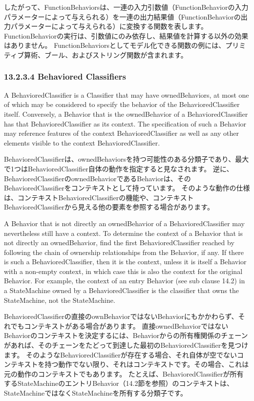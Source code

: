 \documentclass[a4paper,11pt]{ltjsarticle}
\begin{document}
したがって、FunctionBehaviorsは、一連の入力引数値（FunctionBehaviorの入力パラメーターによって与えられる）を一連の出力結果値（FunctionBehaviorの出力パラメーターによって与えられる）に変換する関数を表します。
FunctionBehaviorの実行は、引数値にのみ依存し、結果値を計算する以外の効果はありません。
FunctionBehaviorsとしてモデル化できる関数の例には、プリミティブ算術、ブール、およびストリング関数が含まれます。

\subsubsection*{13.2.3.4 Behaviored Classifiers}

A BehavioredClassifier is a Classifier that may have ownedBehaviors, at most one of which may be considered to specify the behavior of the BehavioredClassifier itself. 
Conversely, a Behavior that is the ownedBehavior of a BehavioredClassifier has that BehavioredClassifier as its context. 
The specification of such a Behavior may reference features of the context BehavioredClassifier as well as any other elements visible to the context BehavioredClassifier.

BehavioredClassifierは、ownedBehaviorsを持つ可能性のある分類子であり、最大で1つはBehavioredClassifier自体の動作を指定すると見なされます。
逆に、BehavioredClassifierのownedBehaviorであるBehaviorは、そのBehavioredClassifierをコンテキストとして持っています。
そのような動作の仕様は、コンテキストBehavioredClassifierの機能や、コンテキストBehavioredClassifierから見える他の要素を参照する場合があります。

A Behavior that is not directly an ownedBehavior of a BehavioredClassifier may nevertheless still have a context. 
To determine the context of a Behavior that is not directly an ownedBehavior, find the first BehavioredClassifier reached by following the chain of ownership relationships from the Behavior, if any. 
If there is such a BehavioredClassifier, then it is the context, unless it is itself a Behavior with a non-empty context, in which case this is also the context for the original Behavior. 
For example, the context of an entry Behavior (see sub clause 14.2) in a StateMachine owned by a BehavioredClassifier is the classifier that owns the StateMachine, not the StateMachine.

BehavioredClassifierの直接のownBehaviorではないBehaviorにもかかわらず、それでもコンテキストがある場合があります。
直接ownedBehaviorではないBehaviorのコンテキストを決定するには、Behaviorからの所有権関係のチェーンがあれば、そのチェーンをたどって到達した最初のBehavioredClassifierを見つけます。
そのようなBehavioredClassifierが存在する場合、それ自体が空でないコンテキストを持つ動作でない限り、それはコンテキストです。その場合、これは元の動作のコンテキストでもあります。
たとえば、BehavioredClassifierが所有するStateMachineのエントリBehavior（14.2節を参照）のコンテキストは、StateMachineではなくStateMachineを所有する分類子です。
\end{document}
